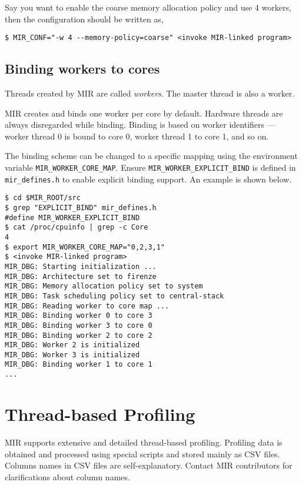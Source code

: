 \documentclass[11pt,a4paper]{article}
\begin{document}
Say you want to enable the coarse memory allocation policy and use 4 workers, then the configuration should be written as,

\begin{lstlisting}[style=MyInputStyle]
$ MIR_CONF="-w 4 --memory-policy=coarse" <invoke MIR-linked program>
\end{lstlisting}

\subsection{Binding workers to cores}\label{sec:binding-workers-to-cores}
Threads created by MIR are called \textit{workers}. The master thread is also a worker.

MIR creates and binds one worker per core by default. Hardware threads are always disregarded while binding. Binding is based on worker identifiers --- worker thread 0 is bound to core 0, worker thread 1 to core 1, and so on.

The binding scheme can be changed to a specific mapping using the environment variable \texttt{MIR\_WORKER\_CORE\_MAP}. Ensure \texttt{MIR\_WORKER\_EXPLICIT\_BIND} is defined in \texttt{mir\_defines.h} to enable explicit binding support. An example is shown below.

\begin{lstlisting}[style=MyInputStyle]
$ cd $MIR_ROOT/src
$ grep "EXPLICIT_BIND" mir_defines.h
#define MIR_WORKER_EXPLICIT_BIND
$ cat /proc/cpuinfo | grep -c Core
4
$ export MIR_WORKER_CORE_MAP="0,2,3,1"
$ <invoke MIR-linked program>
MIR_DBG: Starting initialization ...
MIR_DBG: Architecture set to firenze
MIR_DBG: Memory allocation policy set to system
MIR_DBG: Task scheduling policy set to central-stack
MIR_DBG: Reading worker to core map ...
MIR_DBG: Binding worker 0 to core 3
MIR_DBG: Binding worker 3 to core 0
MIR_DBG: Binding worker 2 to core 2
MIR_DBG: Worker 2 is initialized
MIR_DBG: Worker 3 is initialized
MIR_DBG: Binding worker 1 to core 1
...
\end{lstlisting}

\section{Thread-based Profiling}\label{sec:thread-based-profiling}

MIR supports extensive and detailed thread-based profiling. Profiling data is obtained and processed using special scripts and stored mainly as CSV files. Columns names in CSV files are self-explanatory. Contact MIR contributors for clarifications about column names.
\end{document}

